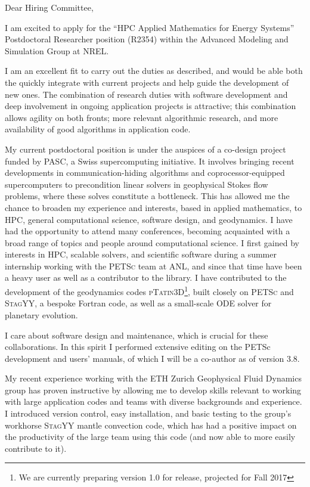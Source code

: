 \documentclass{letter}
\begin{document}
\begin{letter}{}
\opening{Dear Hiring Committee,}

  I am excited to apply for the ``HPC Applied Mathematics for Energy Systems'' Postdoctoral Researcher position (R2354) within the Advanced Modeling and Simulation Group at NREL.

I am an excellent fit to carry out the duties as described, and would be able both the quickly integrate with current projects and help guide the development of new ones.
The combination of research duties with software development and deep involvement in ongoing application projects is attractive; this combination allows agility on both fronts; more relevant algorithmic research, and more availability of good algorithms in application code.

  My current postdoctoral position is under the auspices of a co-design project funded by PASC, a Swiss supercomputing initiative. It involves bringing recent developments in communication-hiding algorithms and coprocessor-equipped supercomputers to precondition linear solvers in geophysical Stokes flow problems, where these solves constitute a bottleneck. This has allowed me the chance to broaden my experience and interests, based in applied mathematics, to  HPC, general computational science, software design, and geodynamics. I have had the opportunity to attend many conferences, becoming acquainted with a broad range of topics and people around computational science.
  I first gained by interests in HPC, scalable solvers, and scientific software during a summer internship working with the \textsc{PETSc} team at ANL, and since that time have been a heavy user as well as a contributor to the library.
  I have contributed to the development of the geodynamics codes \textsc{pTatin3D}\footnote{We are currently preparing version 1.0 for release, projected for Fall 2017}, built closely on \textsc{PETSc} and \textsc{StagYY}, a bespoke Fortran code, as well as a small-scale ODE solver for planetary evolution.

I care about software design and maintenance, which is crucial for these collaborations. In this spirit I performed extensive editing on the PETSc development and users' manuals, of which I will be a co-author as of version 3.8.

  My recent experience working with the ETH Zurich Geophysical Fluid Dynamics group has proven instructive by allowing me to develop skills relevant to working with large application codes and teams with diverse backgrounds and experience. I introduced version control, easy installation, and basic testing to the group's workhorse \textsc{StagYY} mantle convection code, which has had a positive impact on the productivity of the large team using this code (and now able to more easily contribute to it).


\end{letter}
\end{document}
